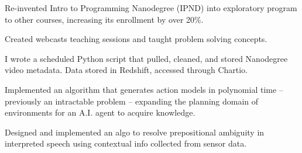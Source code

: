 \documentclass[]{deedy-resume-openfont}
\begin{document}
\begin{minipage}[t]{0.66\textwidth}
\begin{tightemize}

\item Re-invented Intro to Programming Nanodegree (IPND) into exploratory program to other courses, increasing its enrollment by over 20\%.

\item Created webcasts teaching sessions and taught problem solving concepts.
\item I wrote a scheduled Python script that pulled, cleaned, and stored Nanodegree video metadata. Data stored in Redshift, accessed through Chartio.
\end{tightemize}
\sectionsep

\begin{tightemize}
\item Implemented an algorithm that generates action models in polynomial time -- previously an intractable problem -- expanding the planning domain of environments for an A.I. agent to acquire knowledge.

\item Designed and implemented an algo to resolve prepositional ambiguity in interpreted speech using contextual info collected from sensor data.
\end{tightemize}





\end{minipage}
\end{document}
